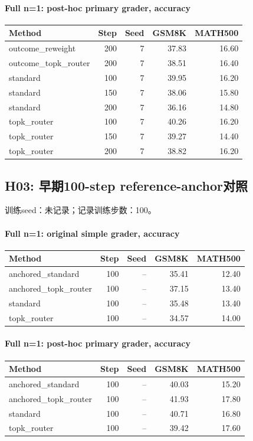 \paragraph{Full n=1: post-hoc primary grader, accuracy}
{\footnotesize\setlength{\tabcolsep}{3.5pt}
\begin{longtable}{@{}p{1.4in}rrrr@{}}
\toprule
Method & Step & Seed & GSM8K & MATH500 \\
\midrule\endhead
outcome\_\allowbreak{}reweight & 200 & 7 & 37.83 & 16.60 \\
outcome\_\allowbreak{}topk\_\allowbreak{}router & 200 & 7 & 38.51 & 16.40 \\
standard & 100 & 7 & 39.95 & 16.20 \\
standard & 150 & 7 & 38.06 & 15.80 \\
standard & 200 & 7 & 36.16 & 14.80 \\
topk\_\allowbreak{}router & 100 & 7 & 40.26 & 16.20 \\
topk\_\allowbreak{}router & 150 & 7 & 39.27 & 14.40 \\
topk\_\allowbreak{}router & 200 & 7 & 38.82 & 16.20 \\
\bottomrule\end{longtable}
}
\subsection{H03: 早期100-step reference-anchor对照}
\label{history:early_anchor100}
训练seed：未记录；记录训练步数：100。
\paragraph{Full n=1: original simple grader, accuracy}
{\footnotesize\setlength{\tabcolsep}{3.5pt}
\begin{longtable}{@{}p{1.4in}rrrr@{}}
\toprule
Method & Step & Seed & GSM8K & MATH500 \\
\midrule\endhead
anchored\_\allowbreak{}standard & 100 & -- & 35.41 & 12.40 \\
anchored\_\allowbreak{}topk\_\allowbreak{}router & 100 & -- & 37.15 & 13.40 \\
standard & 100 & -- & 35.48 & 13.40 \\
topk\_\allowbreak{}router & 100 & -- & 34.57 & 14.00 \\
\bottomrule\end{longtable}
}
\paragraph{Full n=1: post-hoc primary grader, accuracy}
{\footnotesize\setlength{\tabcolsep}{3.5pt}
\begin{longtable}{@{}p{1.4in}rrrr@{}}
\toprule
Method & Step & Seed & GSM8K & MATH500 \\
\midrule\endhead
anchored\_\allowbreak{}standard & 100 & -- & 40.03 & 15.20 \\
anchored\_\allowbreak{}topk\_\allowbreak{}router & 100 & -- & 41.93 & 17.80 \\
standard & 100 & -- & 40.71 & 16.80 \\
topk\_\allowbreak{}router & 100 & -- & 39.42 & 17.60 \\
\bottomrule\end{longtable}
}
